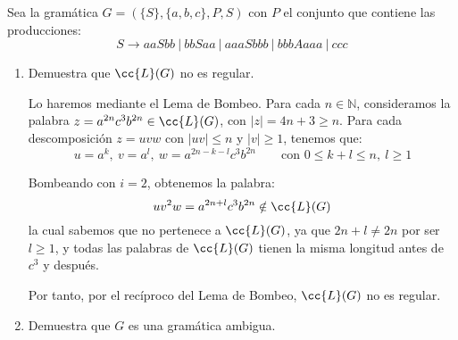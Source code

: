 \documentclass[12pt]{article}
\begin{document}
\begin{ejercicio}
    Sea la gramática $G=(\{S\},\{a,b,c\},P,S)$ con $P$ el conjunto que contiene las producciones:
    \begin{equation*}
        S \rightarrow aaSbb\ |\ bbSaa\ |\ aaaSbbb\ |\ bbbAaaa\ |\ ccc
    \end{equation*}
    \begin{enumerate}
        \item Demuestra que $\cc{L}(G)$ no es regular.
        
        Lo haremos mediante el Lema de Bombeo. Para cada $n\in\mathbb{N}$, consideramos la palabra $z=a^{2n}c^3b^{2n}\in \cc{L}(G)$, con $|z|=4n+3\geq n$.
        Para cada descomposición $z=uvw$ con $|uv|\leq n$ y $|v|\geq 1$, tenemos que:
        \begin{equation*}
            u=a^k,\ v=a^l,\ w=a^{2n-k-l}c^3b^{2n}\qquad \text{con } 0\leq k+l\leq n,\ l\geq 1
        \end{equation*}

        Bombeando con $i=2$, obtenemos la palabra:
        \begin{equation*}
            uv^2w=a^{2n + l}c^3b^{2n}\notin \cc{L}(G)
        \end{equation*}
        la cual sabemos que no pertenece a $\cc{L}(G)$, ya que $2n+l\neq 2n$ por ser $l\geq 1$, y todas las palabras de $\cc{L}(G)$ tienen la misma longitud antes de $c^3$ y después.

        Por tanto, por el recíproco del Lema de Bombeo, $\cc{L}(G)$ no es regular.
        \item Demuestra que $G$ es una gramática ambigua.
        

\end{enumerate}
\end{ejercicio}
\end{document}
